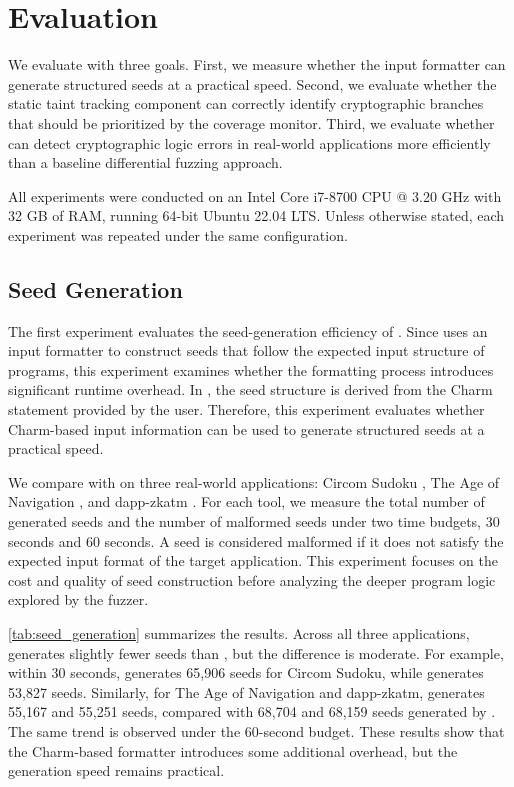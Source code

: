 \section{Evaluation}
\label{sec:greybox-evaluation}

We evaluate \greyboxfuzz with three goals. First, we measure whether the input formatter can generate structured seeds at a practical speed. Second, we evaluate whether the static taint tracking component can correctly identify cryptographic branches that should be prioritized by the coverage monitor. Third, we evaluate whether \greyboxfuzz can detect cryptographic logic errors in real-world \zksnark applications more efficiently than a baseline differential fuzzing approach.

All experiments were conducted on an Intel Core i7-8700 CPU @ 3.20 GHz with 32 GB of RAM, running 64-bit Ubuntu 22.04 LTS. Unless otherwise stated, each experiment was repeated under the same configuration.

\subsection{Seed Generation}

The first experiment evaluates the seed-generation efficiency of \greyboxfuzz. Since \greyboxfuzz uses an input formatter to construct seeds that follow the expected input structure of \zksnark programs, this experiment examines whether the formatting process introduces significant runtime overhead. In \greyboxfuzz, the seed structure is derived from the Charm statement provided by the user. Therefore, this experiment evaluates whether Charm-based input information can be used to generate structured seeds at a practical speed.

We compare \greyboxfuzz with \afl on three real-world \zksnark applications: Circom Sudoku \cite{circom_sudoku}, The Age of Navigation \cite{age_of_navigation}, and dapp-zkatm \cite{dapp_zkatm}. For each tool, we measure the total number of generated seeds and the number of malformed seeds under two time budgets, 30 seconds and 60 seconds. A seed is considered malformed if it does not satisfy the expected input format of the target application. This experiment focuses on the cost and quality of seed construction before analyzing the deeper program logic explored by the fuzzer.

\autoref{tab:seed_generation} summarizes the results. Across all three applications, \greyboxfuzz generates slightly fewer seeds than \afl, but the difference is moderate. For example, within 30 seconds, \afl generates 65,906 seeds for Circom Sudoku, while \greyboxfuzz generates 53,827 seeds. Similarly, for The Age of Navigation and dapp-zkatm, \greyboxfuzz generates 55,167 and 55,251 seeds, compared with 68,704 and 68,159 seeds generated by \afl. The same trend is observed under the 60-second budget. These results show that the Charm-based formatter introduces some additional overhead, but the generation speed remains practical.



